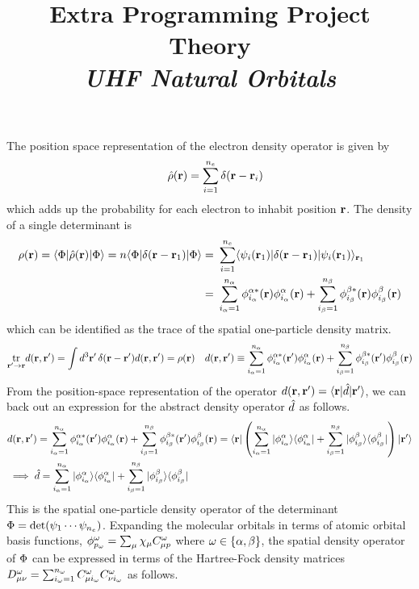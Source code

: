 \documentclass[11pt,fleqn]{article}
\title{Extra Programming Project Theory\\
\textit{UHF Natural Orbitals}}
\date{}
\author{}
\begin{document}
\maketitle


The position space representation of the electron density operator is given by
\begin{align*}
&&
  \hat{\rho }(\mathbf{r})
=
  \sum_{i=1}^{n_e}
  \delta (\mathbf{r}-\mathbf{r}_i)
\end{align*}
which adds up the probability for each electron to inhabit position $\mathbf{r}$.
The density of a single determinant is
\begin{align*}
  \rho (\mathbf{r})
=
  \langle\Phi |\hat{\rho }(\mathbf{r})|\Phi \rangle
=
  n\langle\Phi |\delta (\mathbf{r}-\mathbf{r}_1)|\Phi \rangle
=&\
  \sum_{i=1}^{n_e}
  \langle\psi _i(\mathbf{r}_1)|\delta (\mathbf{r}-\mathbf{r}_1)|\psi _i(\mathbf{r}_1)\rangle_{\mathbf{r}_1}
\\=&\
  \sum_{i_{\alpha }=1}^{n_{\alpha }}
  \phi _{i_{\alpha }}^{\alpha *}(\mathbf{r})
  \phi _{i_{\alpha }}^{\alpha }(\mathbf{r})
+
  \sum_{i_{\beta }=1}^{n_{\beta }}
  \phi _{i_{\beta }}^{\beta *}(\mathbf{r})
  \phi _{i_{\beta }}^{\beta }(\mathbf{r})
\end{align*}
which can be identified as the trace of the spatial one-particle density matrix.
\begin{align*}
  \underset{\mathbf{r}'\rightarrow\mathbf{r}}{\hspace{1pt}\mathrm{tr}\hspace{1pt}}
  d(\mathbf{r},\mathbf{r}')
=
  \int
  d^3\mathbf{r}'\,
  \delta (\mathbf{r}-\mathbf{r}')d(\mathbf{r},\mathbf{r}')
=
  \rho (\mathbf{r})
&&
  d(\mathbf{r},\mathbf{r}')
\equiv
  \sum_{i_{\alpha }=1}^{n_{\alpha }}
  \phi _{i_{\alpha }}^{\alpha *}(\mathbf{r}')
  \phi _{i_{\alpha }}^{\alpha }(\mathbf{r})
+
  \sum_{i_{\beta }=1}^{n_{\beta }}
  \phi _{i_{\beta }}^{\beta *}(\mathbf{r}')
  \phi _{i_{\beta }}^{\beta }(\mathbf{r})
\end{align*}
From the position-space representation of the operator $d(\mathbf{r},\mathbf{r}')=\langle\mathbf{r}|\hat{d}|\mathbf{r}'\rangle$, we can back out an expression for the abstract density operator $\hat{d}$ as follows.
\begin{align*}
&
  d(\mathbf{r},\mathbf{r}')
=
  \sum_{i_{\alpha }=1}^{n_{\alpha }}
  \phi _{i_{\alpha }}^{\alpha *}(\mathbf{r}')
  \phi _{i_{\alpha }}^{\alpha }(\mathbf{r})
+
  \sum_{i_{\beta }=1}^{n_{\beta }}
  \phi _{i_{\beta }}^{\beta *}(\mathbf{r}')
  \phi _{i_{\beta }}^{\beta }(\mathbf{r})
=
  \langle\mathbf{r}|
  \left(
    \sum_{i_{\alpha }=1}^{n_{\alpha }}
    |\phi _{i_{\alpha }}^{\alpha }\rangle\langle\phi _{i_{\alpha }}^{\alpha }|
  +
    \sum_{i_{\beta }=1}^{n_{\beta }}
    |\phi _{i_{\beta }}^{\beta }\rangle\langle\phi _{i_{\beta }}^{\beta }|
  \right)
  |\mathbf{r}'\rangle
\\&
\implies
  \hat{d}
=
  \sum_{i_{\alpha }=1}^{n_{\alpha }}
  |\phi _{i_{\alpha }}^{\alpha }\rangle\langle\phi _{i_{\alpha }}^{\alpha }|
+
  \sum_{i_{\beta }=1}^{n_{\beta }}
  |\phi _{i_{\beta }}^{\beta }\rangle\langle\phi _{i_{\beta }}^{\beta }|
\end{align*}
This is the spatial one-particle density operator of the determinant $\Phi =\det(\psi _1\cdots \psi _{n_e})$.
Expanding the molecular orbitals in terms of atomic orbital basis functions, $\f_{p_\w}^\w=\sum_\mu\x_{\mu}C_{\mu p}^\w$ where $\omega \in\{\alpha ,\beta \}$, the spatial density operator of $\Phi $ can be expressed in terms of the Hartree-Fock density matrices $D_{\mu\nu}^\w=\sum_{i_\w=1}^{n_\w}C_{\mu i_\w}^\w C_{\nu i_\w}^\w$ as follows.
\end{document}
